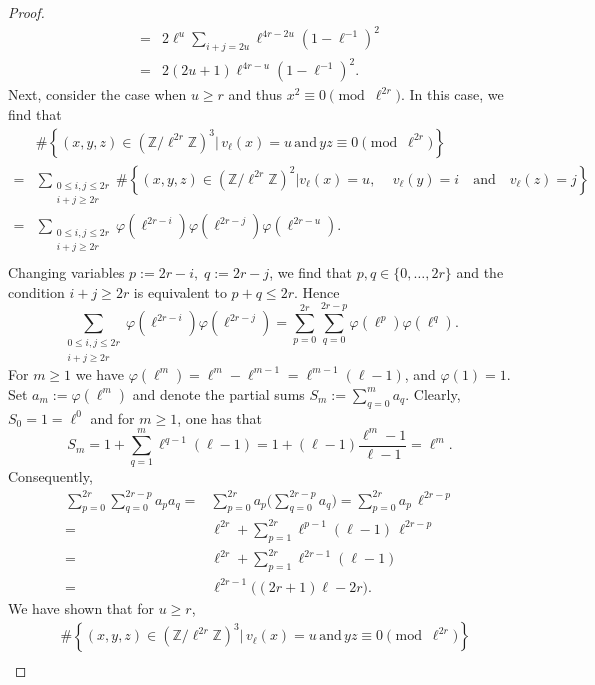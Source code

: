 \documentclass[table]{amsart}
\newcommand{\Z}{\mathbb{Z}}
\numberwithin{equation}{section}
\begin{document}
\begin{proof}
\begin{equation}
\begin{split}
=& 2\ell^u\sum_{i+j=2u} \ell^{4r-2u}\left(1-\ell^{-1}\right)^2\\
=& 2(2u+1) \ell^{4r-u}\left(1-\ell^{-1}\right)^2.
\end{split}\end{equation}
Next, consider the case when $u\geq r$ and thus $x^2\equiv 0\pmod{\ell^{2r}}$. In this case, we find that 
\[\begin{split}&\#\left\{(x,y,z)\in(\Z/\ell^{2r}\Z)^3|\, v_\ell(x)=u\,\text{and}\, yz\equiv 0\pmod{\ell^{2r}}\right\}\\
=&\sum_{\substack{0\leq i,j\leq 2r\\
i+j\geq 2r}} \#\left\{(x,y,z)\in(\Z/\ell^{2r}\Z)^2|v_\ell(x)=u,\quad \, v_\ell(y)=i\quad\text{and}\quad v_\ell(z)=j\right\}\\
=& \sum_{\substack{0\leq i,j\leq 2r\\
i+j\geq 2r}}\varphi(\ell^{2r-i})\varphi(\ell^{2r-j})\varphi(\ell^{2r-u}).\\
\end{split}\]
\noindent Changing variables \(p:=2r-i,\; q:=2r-j\), we find that \(p,q\in\{0,\dots,2r\}\) and the condition \(i+j\ge2r\) is equivalent to \(p+q\le2r\). Hence
\[
\sum_{\substack{0\le i,j\le 2r\\ i+j\ge 2r}}
\varphi(\ell^{2r-i})\varphi(\ell^{2r-j})
=
\sum_{p=0}^{2r}\sum_{q=0}^{2r-p}\varphi(\ell^{p})\varphi(\ell^{q}).
\]
\noindent For \(m\ge1\) we have \(\varphi(\ell^{m})=\ell^{m}-\ell^{m-1}=\ell^{m-1}(\ell-1)\), and \(\varphi(1)=1\). Set
\(
a_m:=\varphi(\ell^m)
\)
and denote the partial sums \(S_m:=\sum_{q=0}^{m}a_q\). Clearly, $S_0=1=\ell^0$ and for $m\geq 1$, one has that
\[
S_m=1+\sum_{q=1}^m \ell^{q-1}(\ell-1)=1+(\ell-1)\frac{\ell^{m}-1}{\ell-1}=\ell^{m}.
\]
Consequently,
\[
\begin{split} \sum_{p=0}^{2r}\sum_{q=0}^{2r-p}a_p a_q
=&\sum_{p=0}^{2r} a_p\Big(\sum_{q=0}^{2r-p}a_q\Big)
=\sum_{p=0}^{2r} a_p\,\ell^{2r-p}\\
=&\ell^{2r} + \sum_{p=1}^{2r} \ell^{p-1}(\ell-1)\,\ell^{2r-p}\\
= & \ell^{2r} + \sum_{p=1}^{2r} \ell^{2r-1}(\ell-1)\\
=&\ell^{2r-1}\big((2r+1)\ell - 2r\big).
\end{split}
\]
We have shown that for $u\geq r$,
\begin{equation}\label{u>=r eqn}\begin{split}
&\#\left\{(x,y,z)\in(\Z/\ell^{2r}\Z)^3|\, v_\ell(x)
=u\,\text{and}\, yz\equiv 0\pmod{\ell^{2r}}\right\}\\

\end{split}
\end{equation}
\end{proof}
\end{document}

